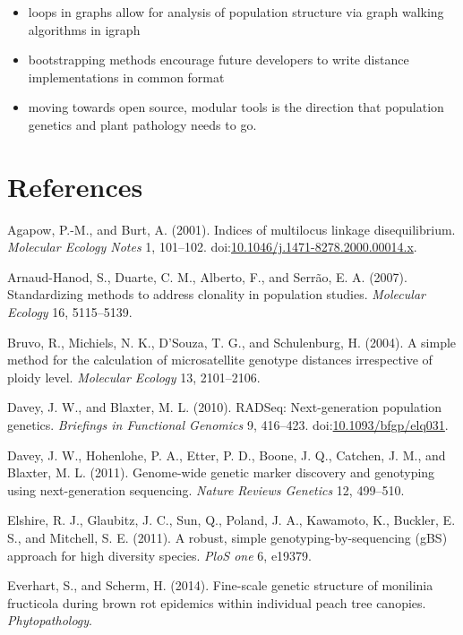 \documentclass{frontiersSCNS} %
\begin{document}
\begin{itemize}
\itemsep1pt\parskip0pt
\item
  loops in graphs allow for analysis of population structure via graph
  walking algorithms in igraph
\item
  bootstrapping methods encourage future developers to write distance
  implementations in common format
\item
  moving towards open source, modular tools is the direction that
  population genetics and plant pathology needs to go.
\end{itemize}

\section*{References}\label{references}

Agapow, P.-M., and Burt, A. (2001). Indices of multilocus linkage
disequilibrium. \emph{Molecular Ecology Notes} 1, 101--102.
doi:\href{http://dx.doi.org/10.1046/j.1471-8278.2000.00014.x}{10.1046/j.1471-8278.2000.00014.x}.

Arnaud-Hanod, S., Duarte, C. M., Alberto, F., and Serr{ã}o, E. A.
(2007). Standardizing methods to address clonality in population
studies. \emph{Molecular Ecology} 16, 5115--5139.

Bruvo, R., Michiels, N. K., D'Souza, T. G., and Schulenburg, H. (2004).
A simple method for the calculation of microsatellite genotype distances
irrespective of ploidy level. \emph{Molecular Ecology} 13, 2101--2106.

Davey, J. W., and Blaxter, M. L. (2010). RADSeq: Next-generation
population genetics. \emph{Briefings in Functional Genomics} 9,
416--423.
doi:\href{http://dx.doi.org/10.1093/bfgp/elq031}{10.1093/bfgp/elq031}.

Davey, J. W., Hohenlohe, P. A., Etter, P. D., Boone, J. Q., Catchen, J.
M., and Blaxter, M. L. (2011). Genome-wide genetic marker discovery and
genotyping using next-generation sequencing. \emph{Nature Reviews
Genetics} 12, 499--510.

Elshire, R. J., Glaubitz, J. C., Sun, Q., Poland, J. A., Kawamoto, K.,
Buckler, E. S., and Mitchell, S. E. (2011). A robust, simple
genotyping-by-sequencing (gBS) approach for high diversity species.
\emph{PloS one} 6, e19379.

Everhart, S., and Scherm, H. (2014). Fine-scale genetic structure of
monilinia fructicola during brown rot epidemics within individual peach
tree canopies. \emph{Phytopathology}.
\end{document}
